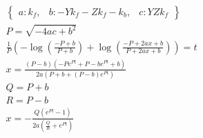 \begin{align}
  \begin{Bmatrix}a : k_{f}, & b : - Y k_{f} - Z k_{f} - k_{b}, & c : Y Z k_{f}\end{Bmatrix} \\
  P = \sqrt{- 4 a c + b^{2}} \\
  \frac{1}{P} \left(- \log{\left (\frac{- P + b}{P + b} \right )} + \log{\left (\frac{- P + 2 a x + b}{P + 2 a x + b} \right )}\right) = t \\
  x = \frac{\left(P - b\right) \left(- P e^{P t} + P - b e^{P t} + b\right)}{2 a \left(P + b + \left(P - b\right) e^{P t}\right)} \\
  Q = P + b \\
  R = P - b \\
  x = - \frac{Q \left(e^{P t} - 1\right)}{2 a \left(\frac{Q}{R} + e^{P t}\right)}
\end{align}